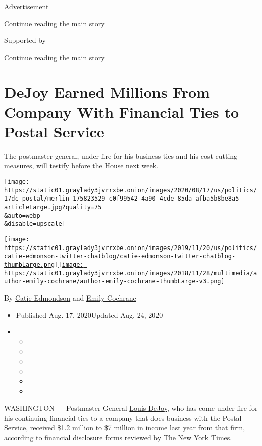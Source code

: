 Advertisement

\protect\hyperlink{after-top}{Continue reading the main story}

Supported by

\protect\hyperlink{after-sponsor}{Continue reading the main story}

\hypertarget{dejoy-earned-millions-from-company-with-financial-ties-to-postal-service}{%
\section{DeJoy Earned Millions From Company With Financial Ties to
Postal
Service}\label{dejoy-earned-millions-from-company-with-financial-ties-to-postal-service}}

The postmaster general, under fire for his business ties and his
cost-cutting measures, will testify before the House next week.

\texttt{[image: https://static01.graylady3jvrrxbe.onion/images/2020/08/17/us/politics/17dc-postal/merlin\_175823529\_c0f99542-4a90-4cde-85da-afba5b8be8a5-articleLarge.jpg?quality=75\\\&auto=webp\\\&disable=upscale]}

\href{https://www.nytimes3xbfgragh.onion/by/catie-edmondson}{\texttt{[image: https://static01.graylady3jvrrxbe.onion/images/2019/11/20/us/politics/catie-edmonson-twitter-chatblog/catie-edmonson-twitter-chatblog-thumbLarge.png]}}\href{https://www.nytimes3xbfgragh.onion/by/emily-cochrane}{\texttt{[image: https://static01.graylady3jvrrxbe.onion/images/2018/11/28/multimedia/author-emily-cochrane/author-emily-cochrane-thumbLarge-v3.png]}}

By \href{https://www.nytimes3xbfgragh.onion/by/catie-edmondson}{Catie
Edmondson} and
\href{https://www.nytimes3xbfgragh.onion/by/emily-cochrane}{Emily
Cochrane}

\begin{itemize}
\item
  Published Aug. 17, 2020Updated Aug. 24, 2020
\item
  \begin{itemize}
  \item
  \item
  \item
  \item
  \item
  \item
  \end{itemize}
\end{itemize}

WASHINGTON --- Postmaster General
\href{https://www.nytimes3xbfgragh.onion/2020/09/02/us/politics/louis-dejoy-usps-paid.html}{Louis
DeJoy}, who has come under fire for his continuing financial ties to a
company that does business with the Postal Service, received \$1.2
million to \$7 million in income last year from that firm, according to
financial disclosure forms reviewed by The New York Times.

